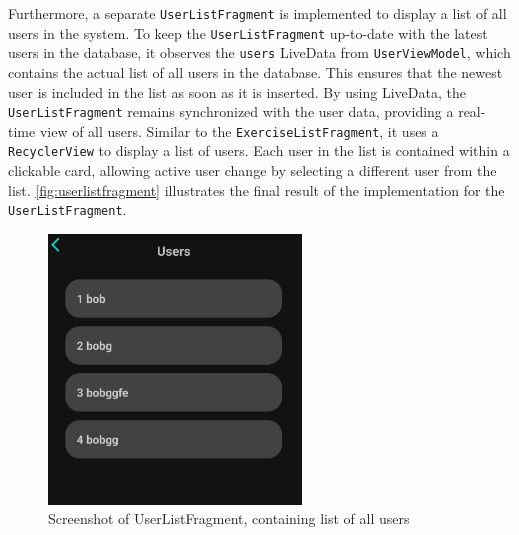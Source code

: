 Furthermore, a separate \texttt{UserListFragment} is implemented to display a list of all users in the system. 
To keep the \texttt{UserListFragment} up-to-date with the latest users in the database, it observes the \texttt{users} LiveData from \texttt{UserViewModel}, which contains the actual list of all users in the database. 
This ensures that the newest user is included in the list as soon as it is inserted. By using LiveData, the \texttt{UserListFragment} remains synchronized with the user data, providing a real-time view of all users.
Similar to the \texttt{ExerciseListFragment}, it uses a \texttt{RecyclerView} to display a list of users. 
Each user in the list is contained within a clickable card, allowing active user change by selecting a different user from the list.
\autoref{fig:userlistfragment} illustrates the final result of the implementation for the \texttt{UserListFragment}.
\begin{figure}[H]
    \centering
    \includegraphics[width=0.6\textwidth]{images/userlistfragment-screenshot.jpeg}
    \caption{Screenshot of UserListFragment, containing list of all users}
    \label{fig:userlistfragment}
\end{figure}



